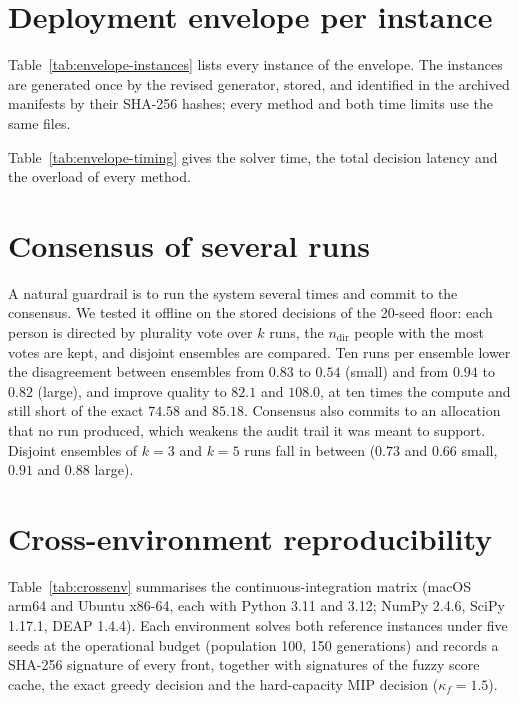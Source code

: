 \documentclass[systems,article,submit,moreauthors,pdftex]{Definitions/mdpi}
\begin{document}
\section{Deployment envelope per instance}\label{app:envelope}
Table~\ref{tab:envelope-instances} lists every instance of the envelope. The instances are
generated once by the revised generator, stored, and identified in the archived manifests by
their SHA-256 hashes; every method and both time limits use the same files.



Table~\ref{tab:envelope-timing} gives the solver time, the total decision latency and the overload
of every method.



\section{Consensus of several runs}\label{app:consensus}
A natural guardrail is to run the system several times and commit to the consensus. We
tested it offline on the stored decisions of the 20-seed floor: each person is directed by plurality vote over $k$ runs,
the $n_{\mathrm{dir}}$ people with the most votes are kept, and disjoint ensembles are
compared. Ten runs per ensemble lower the disagreement between ensembles from $0.83$ to $0.54$
(small) and from $0.94$ to $0.82$ (large), and improve quality to $82.1$ and $108.0$, at ten
times the compute and still short of the exact $74.58$ and $85.18$. Consensus also commits
to an allocation that no run produced, which weakens the audit trail it was meant to support. Disjoint ensembles of $k=3$ and $k=5$ runs fall in between
($0.73$ and $0.66$ small, $0.91$ and $0.88$ large).

\section{Cross-environment reproducibility}\label{app:crossenv}
Table~\ref{tab:crossenv} summarises the continuous-integration matrix (macOS arm64 and Ubuntu
x86-64, each with Python 3.11 and 3.12; NumPy 2.4.6, SciPy 1.17.1, DEAP 1.4.4). Each
environment solves both reference instances under five seeds at the operational budget
(population 100, 150 generations) and records a SHA-256 signature of every front, together
with signatures of the fuzzy score cache, the exact greedy decision and the hard-capacity MIP
decision ($\kappa_f = 1.5$).
\end{document}
